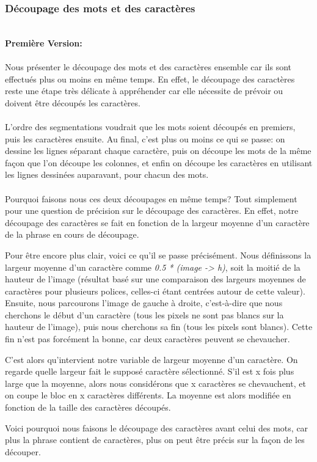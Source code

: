 \documentclass{article}
\begin{document}
    \subsubsection{Découpage des mots et des caractères}
    \\ 
    \textbf{Première Version:}
	\paragraph{}
	Nous présenter le découpage des mots et des caractères ensemble car ils sont effectués plus ou moins en même temps. En effet, le découpage des caractères reste une étape très délicate à appréhender car elle nécessite de prévoir ou doivent être découpés les caractères.
	
	\paragraph{}
	L'ordre des segmentations voudrait que les mots soient découpés en premiers, puis les caractères ensuite. Au final, c'est plus ou moins ce qui se passe: on dessine les lignes séparant chaque caractère, puis on découpe les mots de la même façon que l'on découpe les colonnes, et enfin on découpe les caractères en utilisant les lignes dessinées auparavant, pour chacun des mots.
	
	\paragraph{}
	Pourquoi faisons nous ces deux découpages en même temps? Tout simplement pour une question de précision sur le découpage des caractères. En effet, notre découpage des caractères se fait en fonction de la largeur moyenne d'un caractère de la phrase en cours de découpage.
	\par Pour être encore plus clair, voici ce qu'il se passe précisément. Nous définissons la largeur moyenne d'un caractère comme \textit{0.5 * (image -> h)}, soit la moitié de la hauteur de l'image (résultat basé sur une comparaison des largeurs moyennes de caractères pour plusieurs polices, celles-ci étant centrées autour de cette valeur). Ensuite, nous parcourons l'image de gauche à droite, c'est-à-dire que nous cherchons le début d'un caractère (tous les pixels ne sont pas blancs sur la hauteur de l'image), puis nous cherchons sa fin (tous les pixels sont blancs). Cette fin n'est pas forcément la bonne, car deux caractères peuvent se chevaucher.
	\par C'est alors qu'intervient notre variable de largeur moyenne d'un caractère. On regarde quelle largeur fait le supposé caractère sélectionné. S'il est x fois plus large que la moyenne, alors nous considérons que x caractères se chevauchent, et on coupe le bloc en x caractères différents. La moyenne est alors modifiée en fonction de la taille des caractères découpés.
	\par Voici pourquoi nous faisons le découpage des caractères avant celui des mots, car plus la phrase contient de caractères, plus on peut être précis sur la façon de les découper.
	
\end{document}
